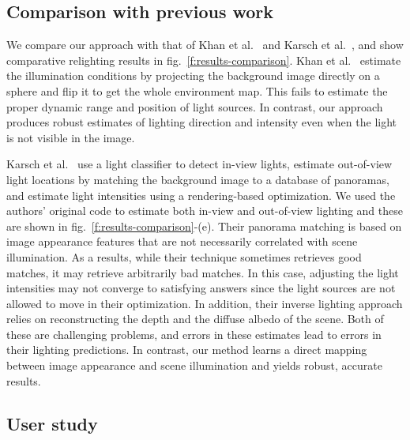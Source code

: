 \subsection{Comparison with previous work}

We compare our approach with that of Khan et al.~ and Karsch et al.~, and show comparative relighting results in fig.~\ref{f:results-comparison}. Khan et al.~ estimate the illumination conditions by projecting the background image directly on a sphere and flip it to get the whole environment map. This fails to estimate the proper dynamic range and position of light sources. In contrast, our approach produces robust estimates of lighting direction and intensity even when the light is not visible in the image. 

Karsch et al.~ use a light classifier to detect in-view lights, estimate out-of-view light locations by matching the background image to a database of panoramas, and estimate light intensities using a rendering-based optimization. We used the authors' original code to estimate both in-view and out-of-view lighting and these are shown in fig.~\ref{f:results-comparison}-(e). Their panorama matching is based on image appearance features that are not necessarily correlated with scene illumination. As a results, while their technique sometimes retrieves good matches, it may retrieve arbitrarily bad matches. In this case, adjusting the light intensities may not converge to satisfying answers since the light sources are not allowed to move in their optimization. In addition, their inverse lighting approach relies on reconstructing the depth and the diffuse albedo of the scene. Both of these are challenging problems, and errors in these estimates lead to errors in their lighting predictions. In contrast, our method learns a direct mapping between image appearance and scene illumination and yields robust, accurate results. 

\subsection{User study}

